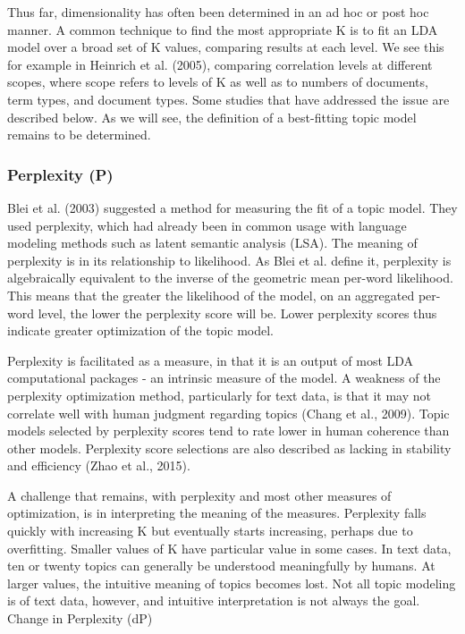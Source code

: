 \documentclass[conference]{IEEEtran}
\begin{document}
Thus far, dimensionality has often been determined in an ad hoc or post hoc manner. A common technique to find the most appropriate K is to fit an LDA model over a broad set of K values, comparing results at each level. We see this for example in Heinrich et al. (2005), comparing correlation levels at different scopes, where scope refers to levels of K as well as to numbers of documents, term types, and document types. Some studies that have addressed the issue are described below. As we will see, the definition of a best-fitting topic model remains to be determined.

\subsubsection{Perplexity (P)}
Blei et al. (2003) suggested a method for measuring the fit of a topic model. They used perplexity, which had already been in common usage with language modeling methods such as latent semantic analysis (LSA). The meaning of perplexity is in its relationship to likelihood. As Blei et al. define it, perplexity is algebraically equivalent to the inverse of the geometric mean per-word likelihood. This means that the greater the likelihood of the model, on an aggregated per-word level, the lower the perplexity score will be. Lower perplexity scores thus indicate greater optimization of the topic model.

Perplexity is facilitated as a measure, in that it is an output of most LDA computational packages - an intrinsic measure of the model. A weakness of the perplexity optimization method, particularly for text data, is that it may not correlate well with human judgment regarding topics (Chang et al., 2009). Topic models selected by perplexity scores tend to rate lower in human coherence than other models. Perplexity score selections are also described as lacking in stability and efficiency (Zhao et al., 2015).

A challenge that remains, with perplexity and most other measures of optimization, is in interpreting the meaning of the measures. Perplexity falls quickly with increasing K but eventually starts increasing, perhaps due to overfitting. Smaller values of K have particular value in some cases. In text data, ten or twenty topics can generally be understood meaningfully by humans. At larger values, the intuitive meaning of topics becomes lost. Not all topic modeling is of text data, however, and intuitive interpretation is not always the goal.
Change in Perplexity (dP)
\end{document}
